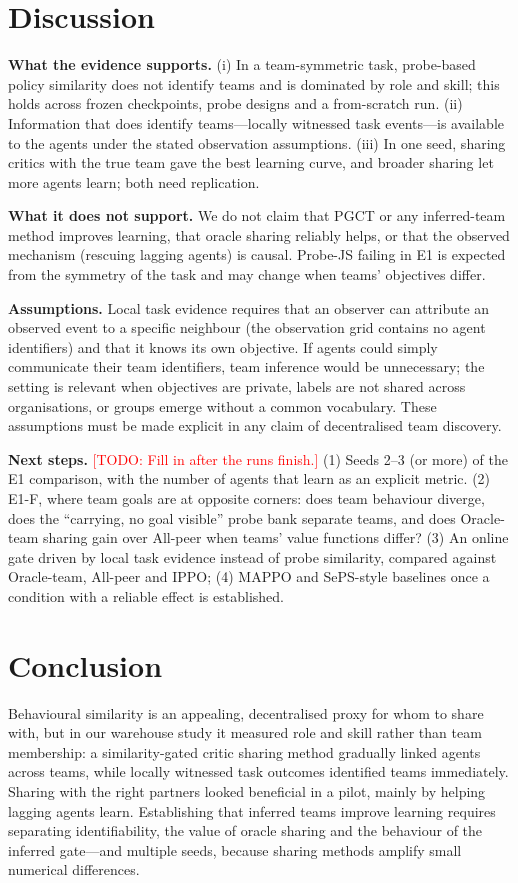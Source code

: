 \documentclass{article}
\newcommand{\todo}[1]{\textcolor{red}{[TODO: #1]}}
\begin{document}
\section{Discussion}
\textbf{What the evidence supports.} (i) In a team-symmetric task, probe-based policy similarity does not identify
teams and is dominated by role and skill; this holds across frozen checkpoints, probe designs and a from-scratch run.
(ii) Information that does identify teams---locally witnessed task events---is available to the agents
under the stated observation assumptions. (iii) In one seed, sharing critics with the true team gave the best
learning curve, and broader sharing let more agents learn; both need replication.

\textbf{What it does not support.} We do not claim that PGCT or any inferred-team method improves learning, that
oracle sharing reliably helps, or that the observed mechanism (rescuing lagging agents) is causal. Probe-JS failing
in E1 is expected from the symmetry of the task and may change when teams' objectives differ.

\textbf{Assumptions.} Local task evidence requires that an observer can attribute an observed event to a specific
neighbour (the observation grid contains no agent identifiers) and that it knows its own objective. If agents
could simply communicate their team identifiers, team inference would be unnecessary; the setting is relevant
when objectives are private, labels are not shared across organisations, or groups emerge without a common
vocabulary. These assumptions must be made explicit in any claim of decentralised team discovery.

\textbf{Next steps.} \todo{Fill in after the runs finish.} (1) Seeds 2--3 (or more) of the E1 comparison, with
the number of agents that learn as an explicit metric. (2) E1-F, where team goals are at opposite corners: does team
behaviour diverge, does the ``carrying, no goal visible'' probe bank separate teams, and does Oracle-team sharing
gain over All-peer when teams' value functions differ? (3) An online gate driven by local task evidence instead of
probe similarity, compared against Oracle-team, All-peer and IPPO; (4) MAPPO and SePS-style baselines once a
condition with a reliable effect is established.

\section{Conclusion}
Behavioural similarity is an appealing, decentralised proxy for whom to share with, but in our warehouse study it
measured role and skill rather than team membership: a similarity-gated critic sharing method gradually linked
agents across teams, while locally witnessed task outcomes identified teams immediately. Sharing with the right
partners looked beneficial in a pilot, mainly by helping lagging agents learn. Establishing that inferred teams
improve learning requires separating identifiability, the value of oracle sharing and the behaviour of the inferred
gate---and multiple seeds, because sharing methods amplify small numerical differences.
\end{document}
